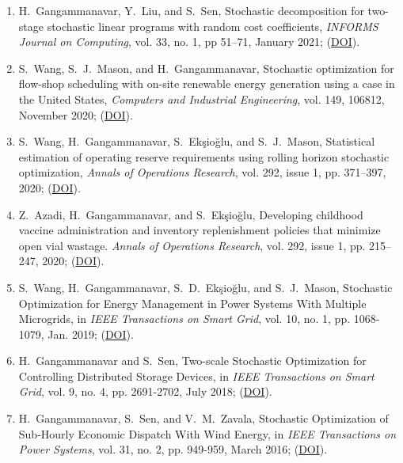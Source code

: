 \documentclass[hyperref, margin]{myResume}
\begin{document}
\begin{resume}
\begin{enumerate}[label=J\arabic*., leftmargin=*]
	\item H.\ Gangammanavar, Y.\ Liu, and S.\ Sen, Stochastic decomposition for two-stage stochastic linear programs with random cost coefficients, \textit{INFORMS Journal on Computing}, vol. 33, no. 1, pp 51–71, January 2021; (\href{https://doi.org/10.1287/ijoc.2019.0929}{DOI}).

	\item S.\ Wang\footnotemark[3], S.\ J.\ Mason, and H.\ Gangammanavar, Stochastic optimization for flow-shop scheduling with on-site renewable energy generation using a case in the United States, \textit{Computers and Industrial Engineering}, vol. 149, 106812, November 2020; (\href{https://doi.org/10.1016/j.cie.2020.106812}{DOI}).

	\item S.\ Wang\footnotemark[3], H.\ Gangammanavar, S.\ Ek{\c{s}}io{\u{g}}lu, and S.\ J.\ Mason, Statistical estimation of operating reserve requirements using rolling horizon stochastic optimization, \textit{Annals of Operations Research}, vol. 292, issue 1, pp. 371–397, 2020; (\href{https://doi.org/10.1007/s10479-019-03482-x}{DOI}).

	\item Z.\ Azadi\footnotemark[3], H.\ Gangammanavar, and S.\ Ek{\c{s}}io{\u{g}}lu, Developing childhood vaccine administration and inventory replenishment policies that minimize open vial wastage. \textit{Annals of Operations Research}, vol. 292, issue 1, pp. 215–247, 2020; (\href{https://doi.org/10.1007/s10479-019-03164-8}{DOI}).

	\item S.\ Wang\footnotemark[3], H.\ Gangammanavar, S.\ D.\ Ek{\c{s}}io{\u{g}}lu, and S.\ J.\ Mason, Stochastic Optimization for Energy Management in Power Systems With Multiple Microgrids, in {\it IEEE Transactions on Smart Grid}, vol. 10, no. 1, pp. 1068-1079, Jan. 2019; (\href{https://doi.org/10.1109/TSG.2017.2759159}{DOI}).

	\item H.\ Gangammanavar and S.\ Sen, Two-scale Stochastic Optimization for Controlling Distributed Storage Devices, in \textit{IEEE Transactions on Smart Grid}, vol. 9, no. 4, pp. 2691-2702, July 2018; (\href{https://doi.org/10.1109/TSG.2016.2616881}{DOI}).

	\item H.\ Gangammanavar, S.\ Sen, and V.\ M.\ Zavala, Stochastic Optimization of Sub-Hourly Economic Dispatch With Wind Energy, in \textit{IEEE Transactions on Power Systems}, vol. 31, no. 2, pp. 949-959, March 2016; (\href{https://doi.org/10.1109/TPWRS.2015.2410301}{DOI}).
	

\end{enumerate}
\end{resume}
\end{document}
